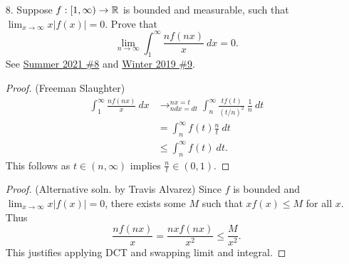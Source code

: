 \begin{itemize}
\begin{enumerate}[(a)]
\item Prove that if $\sum_{n=1}^{\infty} \mu(A_n) < \infty$, then $\mu(\limsup A_n) = 0$.
\begin{proof}
Classic Borel-Cantelli: 
$$\mu(\limsup A_n) = \mu(\cap_{n=1}^{\infty} \cup_{k=n}^{\infty} A_k) \leq\mu(\cup_{k=n}^{\infty} A_k) \leq \sum_{k=n}^{\infty} \mu(A_k) \rightarrow 0.$$
\end{proof}
\end{enumerate}





\item[8.] Suppose $f : [1,\infty) \rightarrow \mathbb{R}$ is bounded and measurable, such that
$\lim_{x \rightarrow \infty} x|f(x)| = 0$. Prove that 
$$\lim_{n \rightarrow \infty} \int_{1}^{\infty} \frac{n f(nx)}{x} \ dx = 0.$$
\label{q:s21-8}
\label{q:w19-9b}
See \hyperref[q:s21-8]{Summer 2021 \#8} and \hyperref[q:w19-9b]{Winter 2019 \#9}.
\begin{proof}(Freeman Slaughter)
\begin{align*}
    \int_{1}^{\infty} \frac{n f(nx)}{x} \ dx &\rightarrow_{n dx = dt}^{nx=t} \int_{n}^{\infty} \frac{t f(t)}{\left(t/n\right)^2} \ \frac{1}{n} \ dt \\
    &= \int_{n}^{\infty} f(t) \frac{n}{t} \ dt \\
    &\leq \int_{n}^{\infty} f(t) \ dt.
\end{align*}
This follows as $t\in(n,\infty)$ implies $\frac{n}{t} \in (0,1)$.
\end{proof}

\begin{proof}(Alternative soln. by Travis Alvarez)
Since $f$ is bounded and $\lim_{x \rightarrow \infty} x|f(x)| = 0$, there exists some $M$ such that $xf(x) \leq M$ for all $x$. Thus 
$$\frac{n f(nx)}{x} = \frac{nx f(nx)}{x^2} \leq \frac{M}{x^2}.$$
This justifies applying DCT and swapping limit and integral. 
\end{proof}
























\end{itemize}